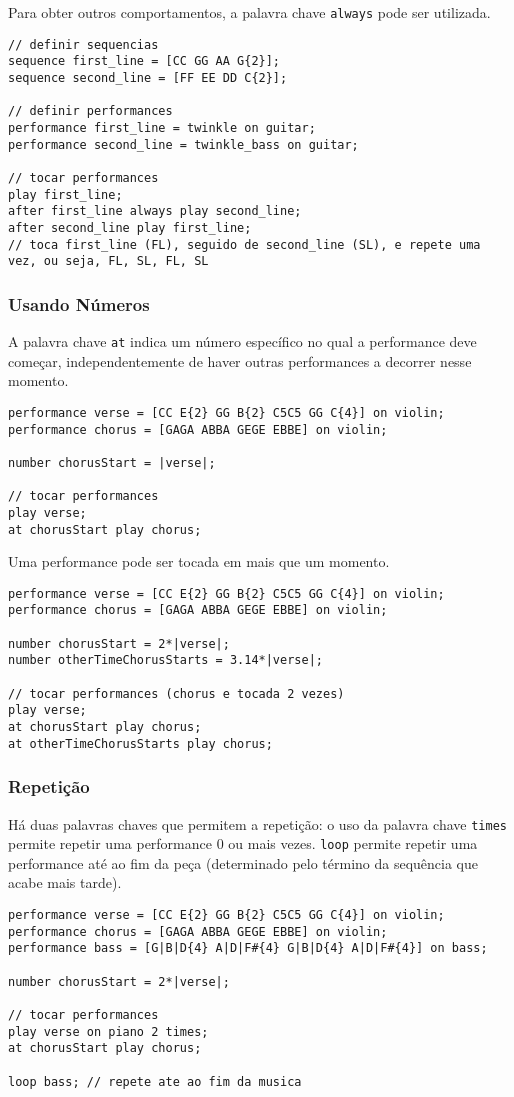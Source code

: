 \documentclass{article}
\begin{document}
Para obter outros comportamentos, a palavra chave \texttt{always} pode ser utilizada.

\begin{lstlisting} 
// definir sequencias
sequence first_line = [CC GG AA G{2}];
sequence second_line = [FF EE DD C{2}];

// definir performances
performance first_line = twinkle on guitar;
performance second_line = twinkle_bass on guitar;

// tocar performances
play first_line;
after first_line always play second_line;
after second_line play first_line;
// toca first_line (FL), seguido de second_line (SL), e repete uma vez, ou seja, FL, SL, FL, SL
\end{lstlisting}

\subsubsection{Usando Números}
A palavra chave \texttt{at} indica um número específico no qual a performance deve começar, independentemente de haver outras performances a decorrer nesse momento. 
\begin{lstlisting} 
performance verse = [CC E{2} GG B{2} C5C5 GG C{4}] on violin;
performance chorus = [GAGA ABBA GEGE EBBE] on violin;

number chorusStart = |verse|;

// tocar performances
play verse;
at chorusStart play chorus;
\end{lstlisting}

Uma performance pode ser tocada em mais que um momento.
\begin{lstlisting} 
performance verse = [CC E{2} GG B{2} C5C5 GG C{4}] on violin;
performance chorus = [GAGA ABBA GEGE EBBE] on violin;

number chorusStart = 2*|verse|;
number otherTimeChorusStarts = 3.14*|verse|;

// tocar performances (chorus e tocada 2 vezes)
play verse;
at chorusStart play chorus;
at otherTimeChorusStarts play chorus;
\end{lstlisting}

\subsubsection{Repetição}
Há duas palavras chaves que permitem a repetição: o uso da palavra chave \texttt{times} permite repetir uma performance 0 ou mais vezes. \texttt{loop} permite repetir uma performance até ao fim da peça (determinado pelo término da sequência que acabe mais tarde).
\begin{lstlisting} 
performance verse = [CC E{2} GG B{2} C5C5 GG C{4}] on violin;
performance chorus = [GAGA ABBA GEGE EBBE] on violin;
performance bass = [G|B|D{4} A|D|F#{4} G|B|D{4} A|D|F#{4}] on bass;

number chorusStart = 2*|verse|;

// tocar performances
play verse on piano 2 times;
at chorusStart play chorus;

loop bass; // repete ate ao fim da musica
\end{lstlisting}
\end{document}
